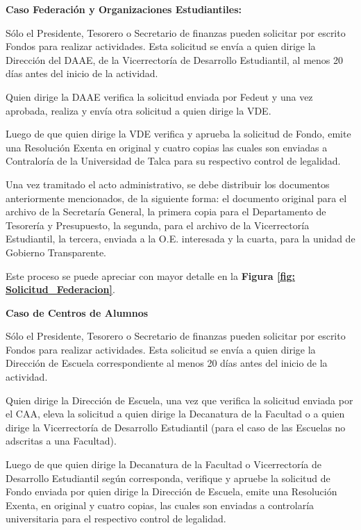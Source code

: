 \begin{tasks}[counter-format = {tsk[A].}]
    \task \textbf{Caso Federación y Organizaciones Estudiantiles:}

    Sólo el Presidente, Tesorero o Secretario de finanzas pueden solicitar por escrito Fondos para realizar actividades. Esta solicitud se envía a quien dirige la Dirección del DAAE, de la Vicerrectoría de Desarrollo Estudiantil, al menos 20 días antes del inicio de la actividad. 

    Quien dirige la DAAE verifica la solicitud enviada por Fedeut y una vez aprobada, realiza y envía otra solicitud a quien dirige la VDE.

    Luego de que quien dirige la VDE verifica y aprueba la solicitud de Fondo, emite una Resolución Exenta en original y cuatro copias las cuales son enviadas a Contraloría de la Universidad de Talca para su respectivo control de legalidad. 
    
    Una vez tramitado el acto administrativo, se debe distribuir los documentos anteriormente mencionados, de la siguiente forma: el documento original para el archivo de la Secretaría General, la primera copia para el Departamento de Tesorería y Presupuesto, la segunda, para el archivo de la Vicerrectoría Estudiantil, la tercera, enviada a la O.E. interesada y la cuarta, para la unidad de Gobierno Transparente.

    Este proceso se puede apreciar con mayor detalle en la \textbf{Figura \ref{fig: Solicitud_Federacion}}.

    \task \textbf{Caso de Centros de Alumnos}

    Sólo el Presidente, Tesorero o Secretario de finanzas pueden solicitar por escrito Fondos para realizar actividades. Esta solicitud se envía a quien dirige la Dirección de Escuela correspondiente al menos 20 días antes del inicio de la actividad. 

    Quien dirige la Dirección de Escuela, una vez que verifica la solicitud enviada por el CAA, eleva la solicitud a quien dirige la Decanatura de la Facultad o a quien dirige la Vicerrectoría de Desarrollo Estudiantil (para el caso de las Escuelas no adscritas a una Facultad).

    Luego de que quien dirige la Decanatura de la Facultad o Vicerrectoría de Desarrollo Estudiantil según corresponda, verifique y apruebe la solicitud de Fondo enviada por quien dirige la Dirección de Escuela, emite una Resolución Exenta, en original y cuatro copias, las cuales son enviadas a controlaría universitaria para el respectivo control de legalidad.


\end{tasks}
